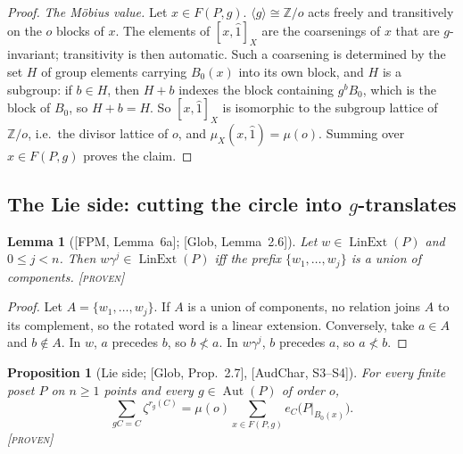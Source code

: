 \documentclass[11pt]{article}
\newtheorem{proposition}[theorem]{Proposition}
\newtheorem{lemma}[theorem]{Lemma}
\theoremstyle{definition}
\theoremstyle{remark}
\newcommand{\Lin}{\operatorname{LinExt}}
\newcommand{\Aut}{\operatorname{Aut}}
\newcommand{\st}[1]{\textup{[\textsc{#1}]}}
\begin{document}
\begin{proof}
\emph{The M\"obius value.} Let $x\in F(P,g)$. $\langle g\rangle\cong\mathbb Z/o$
acts freely and transitively on the $o$ blocks of $x$. The elements of
$[x,\hat1]_X$ are the coarsenings of $x$ that are $g$-invariant; transitivity
is then automatic. Such a coarsening is determined by the set $H$ of group
elements carrying $B_0(x)$ into its own block, and $H$ is a subgroup: if
$b\in H$, then $H+b$ indexes the block containing $g^bB_0$, which is the
block of $B_0$, so $H+b=H$. So $[x,\hat1]_X$ is isomorphic to the subgroup
lattice of $\mathbb Z/o$, i.e.\ the divisor lattice of $o$, and
$\mu_X(x,\hat1)=\mu(o)$. Summing over $x\in F(P,g)$ proves the claim.
\end{proof}

\subsection{The Lie side: cutting the circle into $g$-translates}

\begin{lemma}[{[FPM, Lemma~6a]}; {[Glob, Lemma~2.6]}]\label{lem:rot}
Let $w\in\Lin(P)$ and $0\le j<n$. Then $w\gamma^j\in\Lin(P)$ iff the prefix
$\{w_1,\dots,w_j\}$ is a union of components. \st{proven}
\end{lemma}

\begin{proof}
Let $A=\{w_1,\dots,w_j\}$. If $A$ is a union of components, no relation joins
$A$ to its complement, so the rotated word is a linear extension. Conversely,
take $a\in A$ and $b\notin A$. In $w$, $a$ precedes $b$, so $b\not<a$. In
$w\gamma^j$, $b$ precedes $a$, so $a\not<b$.
\end{proof}

\begin{proposition}[Lie side; {[Glob, Prop.~2.7]}, {[AudChar, S3--S4]}]
\label{prop:Lside}
For every finite poset $P$ on $n\ge1$ points and every $g\in\Aut(P)$ of order $o$,
\[
\sum_{gC=C}\zeta^{r_g(C)}=\mu(o)\sum_{x\in F(P,g)}e_C\bigl(P|_{B_0(x)}\bigr).
\]
\st{proven}
\end{proposition}
\end{document}
